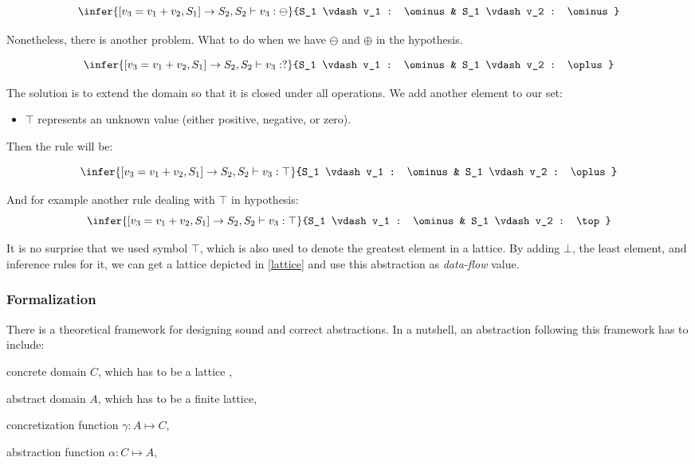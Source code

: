         $$
        \infer{[v_3=v_1+v_2, S_1] \rightarrow S_2, S_2 \vdash v_3 : \ominus}
        {S_1 \vdash v_1 : \ominus & S_1 \vdash v_2 : \ominus}
        $$
        
        Nonetheless, there is another problem. What to do when we have $\ominus$ 
        and $\oplus$ in the hypothesis.
        
        $$
        \infer{[v_3=v_1+v_2, S_1] \rightarrow S_2, S_2 \vdash v_3 : ?}
        {S_1 \vdash v_1 : \ominus & S_1 \vdash v_2 : \oplus}
        $$
        
        The solution is to extend the domain so that it is closed under all operations. 
        We add another element to our set:
        \begin{itemize}
            \item $\top$ represents an unknown value (either positive, negative, or zero).
        \end{itemize}
        Then the rule will be:
        
        $$
        \infer{[v_3=v_1+v_2, S_1] \rightarrow S_2, S_2 \vdash v_3 : \top}
        {S_1 \vdash v_1 : \ominus & S_1 \vdash v_2 : \oplus}
        $$        
        
        And for example another rule dealing with $\top$ in hypothesis:
        $$
        \infer{[v_3=v_1+v_2, S_1] \rightarrow S_2, S_2 \vdash v_3 : \top}
        {S_1 \vdash v_1 : \ominus & S_1 \vdash v_2 : \top}
        $$
        
        It is no surprise that we used symbol $\top$, which is also used to denote the 
        greatest element in a lattice. By adding $\bot$, the least element, and inference 
        rules for it, we can get a lattice depicted in \ref{lattice} and use 
        this abstraction as \emph{data-flow} value.
        
        \subsubsection*{Formalization}

        There is a theoretical framework for designing sound and correct 
        abstractions. In a nutshell, an abstraction following this framework 
        has to include: 
        
        \begin{itemize*}
            \item concrete domain $C$, which has to be a lattice ,
            \item abstract domain $A$, which has to be a finite lattice,
            \item concretization function $\gamma{}:A\mapsto{}C$,
            \item abstraction function $\alpha{}:C\mapsto{}A$,
        \end{itemize*}
        
